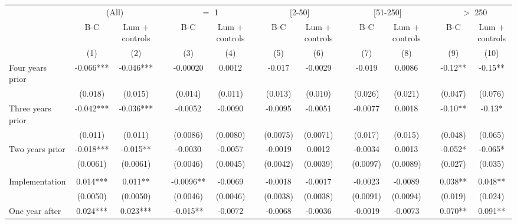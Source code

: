 \begin{tabular}{lcccccccccccccc}
\toprule
      & \multicolumn{2}{c}{(All)} &       & \multicolumn{2}{c}{$=$ 1} &       & \multicolumn{2}{c}{[2-50]} &       & \multicolumn{2}{c}{[51-250]} &       & \multicolumn{2}{c}{$>$ 250} \\
\cmidrule{2-3}\cmidrule{5-6}\cmidrule{8-9}\cmidrule{11-12}\cmidrule{14-15}      & B-C   & Lum + controls &       & B-C   & Lum + controls &       & B-C   & Lum + controls &       & B-C   & Lum + controls &       & B-C   & Lum + controls \\
\midrule
      & (1)   & (2)   &       & (3)   & (4)   &       & (5)   & (6)   &       & (7)   & (8)   &       & (9)   & (10) \\
\midrule
\midrule
Four years prior & -0.066*** & -0.046*** &       & -0.00020 & 0.0012 &       & -0.017 & -0.0029 &       & -0.019 & 0.0086 &       & -0.12** & -0.15** \\
      & (0.018) & (0.015) &       & (0.014) & (0.011) &       & (0.013) & (0.010) &       & (0.026) & (0.021) &       & (0.047) & (0.076) \\
Three years prior & -0.042*** & -0.036*** &       & -0.0052 & -0.0090 &       & -0.0095 & -0.0051 &       & -0.0077 & 0.0018 &       & -0.10** & -0.13* \\
      & (0.011) & (0.011) &       & (0.0086) & (0.0080) &       & (0.0075) & (0.0071) &       & (0.017) & (0.015) &       & (0.048) & (0.065) \\
Two years prior & -0.018*** & -0.015** &       & -0.0030 & -0.0057 &       & -0.0019 & 0.0012 &       & -0.0034 & 0.0013 &       & -0.052* & -0.065* \\
      & (0.0061) & (0.0061) &       & (0.0046) & (0.0045) &       & (0.0042) & (0.0039) &       & (0.0097) & (0.0089) &       & (0.027) & (0.035) \\
      &       &       &       &       &       &       &       &       &       &       &       &       &       &  \\
Implementation & 0.014*** & 0.011** &       & -0.0096** & -0.0069 &       & -0.0018 & -0.0017 &       & -0.0023 & -0.0089 &       & 0.038** & 0.048** \\
      & (0.0050) & (0.0050) &       & (0.0046) & (0.0046) &       & (0.0038) & (0.0038) &       & (0.0091) & (0.0094) &       & (0.019) & (0.024) \\
One year after & 0.024*** & 0.023*** &       & -0.015** & -0.0072 &       & -0.0068 & -0.0036 &       & -0.0019 & -0.0073 &       & 0.070** & 0.091** \\

\end{tabular}

